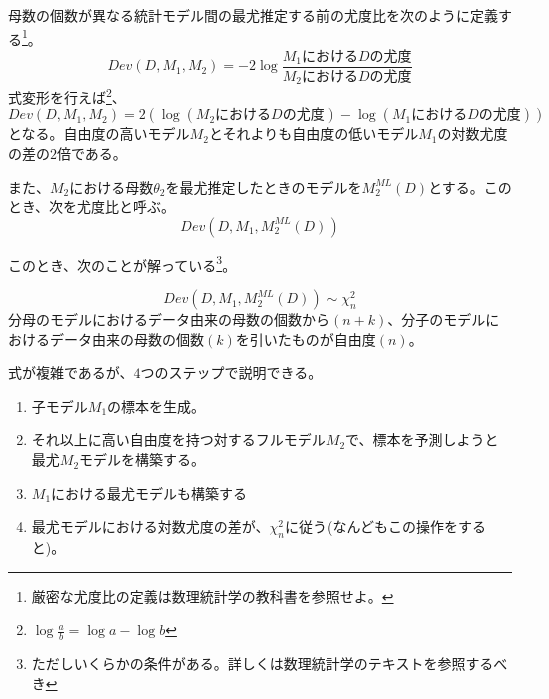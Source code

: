 \begin{defi}
 母数の個数が異なる統計モデル間の最尤推定する前の尤度比を次のように定義する\footnote{厳密な尤度比の定義は数理統計学の教科書を参照せよ。}。
 \begin{equation*}\label{likelihood_equation}
  Dev(D,M_1,M_2) = -2\log\frac{M_1におけるDの尤度}{M_2におけるDの尤度}
 \end{equation*}
式変形を行えば\footnote{$\log\frac{a}{b} =\log a -\log b$}、
 \begin{equation*}\label{loglikelihood_equation_log_minus_log}
 Dev(D,M_1,M_2) = 2\left( \log ( M_2におけるDの尤度 )-\log ( M_1におけるDの尤度 ) \right)
 \end{equation*}
となる。自由度の高いモデル$M_2$とそれよりも自由度の低いモデル$M_1$の対数尤度の差の$2$倍である。

 また、$M_2$における母数$\theta_2$を最尤推定したときのモデルを$M^{ML}_2(D)$とする。このとき、次を尤度比と呼ぶ。
 \begin{equation*}
  Dev(D,M_1,M_2^{ML}(D))
 \end{equation*}
\end{defi}

このとき、次のことが解っている\footnote{ただしいくらかの条件がある。詳しくは数理統計学のテキストを参照するべき}。
\begin{theo}    \label{likelihood_test_basic}
\begin{equation*}
 Dev(D,M_1,M_2^{ML}(D)) \sim \chi^2_{n}
\end{equation*}
分母のモデルにおけるデータ由来の母数の個数から$(n+k)$、分子のモデルにおけるデータ由来の母数の個数$(k)$を引いたものが自由度$(n)$。
\end{theo}

式が複雑であるが、$4$つのステップで説明できる。
\begin{enumerate}
 \item 子モデル$M_1$の標本を生成。
 \item それ以上に高い自由度を持つ対するフルモデル$M_2$で、標本を予測しようと最尤$M_2$モデルを構築する。
 \item $M_1$における最尤モデルも構築する
 \item 最尤モデルにおける対数尤度の差が、$\chi^2_{n}$に従う(なんどもこの操作をすると)。
\end{enumerate}


